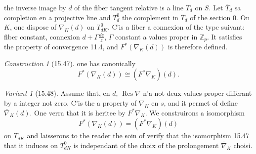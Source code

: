 \documentclass[12pt,a4paper]{article}
\theoremstyle{plain}
\theoremstyle{definition}
\theoremstyle{remark}
\newtheorem{construction}[theorem]{Construction}
\newtheorem{variante}[theorem]{Variant}
\DeclareMathOperator{\Res}{Res}
\newcommand{\bZ}{\mathbb{Z}}
\begin{document}
the inverse image by $d$ of the fiber tangent relative is a line $T_d$ on $S$. Let $\overline{T}_d$ sa completion en a projective line and $T_d^0$ the complement in $\overline{T}_d$ of the section $0$. On $K$, one dispose of $\nabla_K(d)$ on $T_{dK}^0$. C'is a fiber a connexion of the type suivant: fiber constant, connexion $d + \Gamma \frac{dz}{z}$, $\Gamma$ constant a values proper in $\bZ_p$. It satisfies the property of convergence 11.4, and $F^*(\nabla_K(d))$ is therefore defined.

\begin{construction}[15.47]
one has canonically
\[
F^*(\nabla_K(d)) \cong (F^* \nabla_K)(d).
\]
\end{construction}

\begin{variante}[15.48]
Assume that, en $d$, $\Res \nabla$ n'a not deux values proper differant by a integer not zero. C'is the a property of $\nabla_K$ en $s$, and it permet of define $\overline{\nabla}_K(d)$. One verra that it is heritee by $F^* \nabla_K$. We construirons a isomorphism
\begin{equation}\label{eq:15.48.1}
F^*(\nabla_K(d)) = (F^* \nabla_K)(d)
\end{equation}
on $T_{dK}$ and laisserons to the reader the soin of verify that the isomorphism 15.47 that it induces on $T_{dK}^0$ is independant of the choix of the prolongement $\overline{\nabla}_K$ choisi.
\end{variante}
\end{document}
